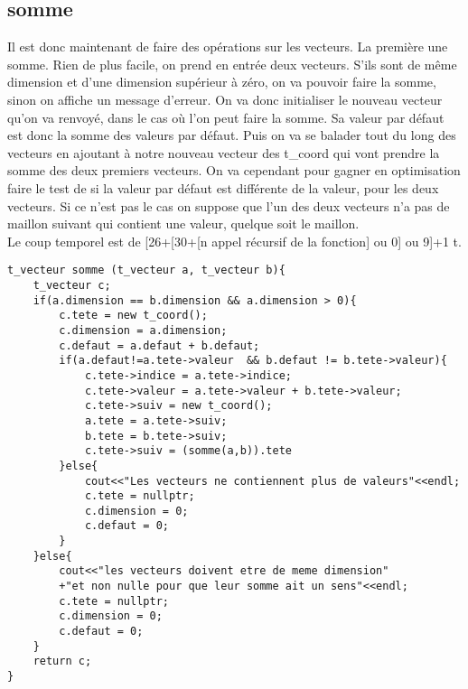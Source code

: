 \documentclass[a4paper,11pt,final]{article}
\begin{document}
\subsection{somme}
Il est donc maintenant de faire des opérations sur les vecteurs. La première une somme. Rien de plus facile, on prend en entrée deux vecteurs. S'ils sont de même dimension et d'une dimension supérieur à zéro, on va pouvoir faire la somme, sinon on affiche un message d'erreur. On va donc initialiser le nouveau vecteur qu'on va renvoyé, dans le cas où l'on peut faire la somme. Sa valeur par défaut est donc la somme des valeurs par défaut. Puis on va se balader tout du long des vecteurs en ajoutant à notre nouveau vecteur des t\_coord qui vont prendre la somme des deux premiers vecteurs. On va cependant pour gagner en optimisation faire le test de si la valeur par défaut est différente de la valeur, pour les deux vecteurs. Si ce n'est pas le cas on suppose que l'un des deux vecteurs n'a pas de maillon suivant qui contient une valeur, quelque soit le maillon.
\\ Le coup temporel est de [26+[30+[n appel récursif de la fonction] ou 0] ou 9]+1 t.

\pagebreak
\begin{verbatim}
t_vecteur somme (t_vecteur a, t_vecteur b){
    t_vecteur c;
    if(a.dimension == b.dimension && a.dimension > 0){
        c.tete = new t_coord();
        c.dimension = a.dimension;
        c.defaut = a.defaut + b.defaut;
        if(a.defaut!=a.tete->valeur  && b.defaut != b.tete->valeur){
            c.tete->indice = a.tete->indice;
            c.tete->valeur = a.tete->valeur + b.tete->valeur;
            c.tete->suiv = new t_coord();
            a.tete = a.tete->suiv;
            b.tete = b.tete->suiv;
            c.tete->suiv = (somme(a,b)).tete
        }else{
            cout<<"Les vecteurs ne contiennent plus de valeurs"<<endl;
            c.tete = nullptr;
            c.dimension = 0;
            c.defaut = 0;
        }
    }else{
        cout<<"les vecteurs doivent etre de meme dimension"
        +"et non nulle pour que leur somme ait un sens"<<endl;
        c.tete = nullptr;
        c.dimension = 0;
        c.defaut = 0;
    }
    return c;
}
\end{verbatim}
\end{document}
